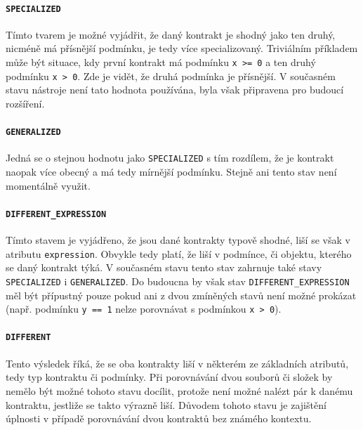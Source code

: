 						\paragraph{\texttt{SPECIALIZED}}
							Tímto tvarem je možné vyjádřit, že daný kontrakt je shodný jako ten druhý, nicméně má přísnější podmínku, je tedy více specializovaný. Triviálním příkladem může být situace, kdy první kontrakt má podmínku \texttt{x >= 0} a ten druhý podmínku \texttt{x > 0}. Zde je vidět, že druhá podmínka je přísnější. V současném stavu nástroje není tato hodnota používána, byla však připravena pro budoucí rozšíření.
							
						\paragraph{\texttt{GENERALIZED}}
							Jedná se o stejnou hodnotu jako \texttt{SPECIALIZED} s tím rozdílem, že je kontrakt naopak více obecný a má tedy mírnější podmínku. Stejně ani tento stav není momentálně využit.
							
						\paragraph{\texttt{DIFFERENT\_EXPRESSION}}
							Tímto stavem je vyjádřeno, že jsou dané kontrakty typově shodné, liší se však v atributu \texttt{expression}. Obvykle tedy platí, že liší v podmínce, či objektu, kterého se daný kontrakt týká. V současném stavu tento stav zahrnuje také stavy \texttt{SPECIALIZED} i \texttt{GENERALIZED}. Do budoucna by však stav \texttt{DIFFERENT\_EXPRESSION} měl být přípustný pouze pokud ani z dvou zmíněných stavů není možné prokázat (např. podmínku \texttt{y == 1} nelze porovnávat s podmínkou \texttt{x > 0}).
							
						\paragraph{\texttt{DIFFERENT}}
							Tento výsledek říká, že se oba kontrakty liší v některém ze základních atributů, tedy typ kontraktu či podmínky. Při porovnávání dvou souborů či složek by nemělo být možné tohoto stavu docílit, protože není možné nalézt pár k danému kontraktu, jestliže se takto výrazně liší. Důvodem tohoto stavu je zajištění úplnosti v případě porovnávání dvou kontraktů bez známého kontextu. 						 
							
